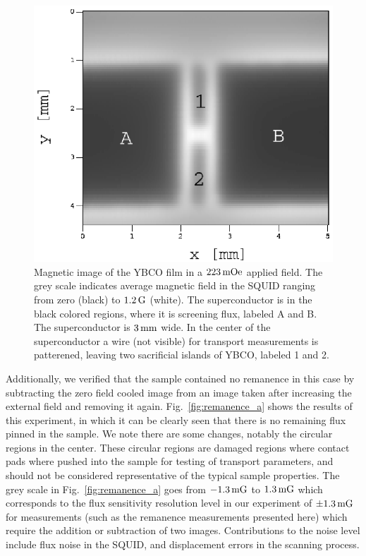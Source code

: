 %
%
\begin{figure}[p]
\includegraphics[width=5.7in]{figs/magpen/fig9.ps}
\caption[Meissner state image and line cut of YBCO film on STO.]
{Magnetic image of the YBCO film in a $223\,\mathrm{mOe}$
applied field. The grey scale indicates average magnetic field in the 
SQUID  ranging from 
zero (black) to $1.2\,\mathrm{G}$ (white). The superconductor is 
in the black colored regions, where it is screening flux, labeled A and B.
The 
superconductor is $3\,\mathrm{mm}$ wide. In the center of the superconductor
a wire (not visible) 
for transport measurements is patterened, leaving two 
sacrificial islands of YBCO, labeled 1 and 2. }
\label{fig:meissner_image}
\end{figure}

Additionally, we verified that the
sample contained no remanence in this case by subtracting the
zero field cooled image from an image taken after increasing
the external field and removing it again. 
Fig.~\ref{fig:remanence_a} shows the results
of this experiment, in which it can be clearly seen that there
is no remaining flux pinned in the sample. We note there are some 
changes, notably the circular regions in the center. These circular
regions are damaged regions where contact pads where pushed 
into the sample for testing of transport parameters, and should not
be considered representative of the typical sample properties. 
The grey scale in Fig.~\ref{fig:remanence_a}  
goes from $-1.3\,\mathrm{mG}$ to $1.3\,\mathrm{mG}$
which corresponds to 
the flux sensitivity resolution
level in our experiment of $\pm 1.3 \,\mathrm{mG}$ for
measurements (such as the remanence measurements presented here)
which require the addition or subtraction of two images. 
Contributions to the noise level include flux noise in the
SQUID, and displacement errors in the scanning process.

